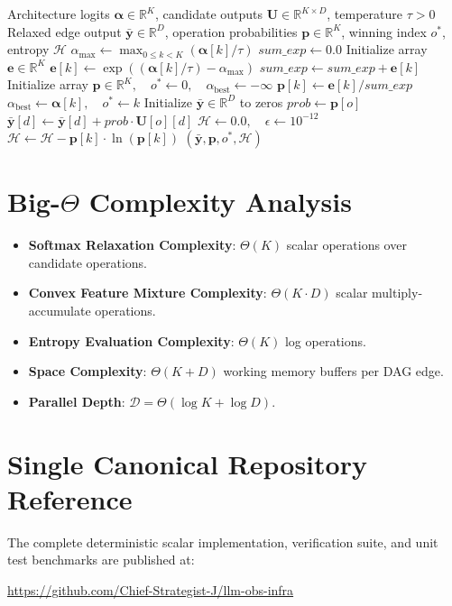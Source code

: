 \documentclass[11pt,a4paper]{article}
\theoremstyle{definition}
\begin{document}
\begin{algorithm}[H]
\caption{Differentiable Architecture Search Edge Relaxation and Discretization}
\begin{algorithmic}[1]
\Require Architecture logits $\boldsymbol{\alpha} \in \mathbb{R}^K$, candidate outputs $\mathbf{U} \in \mathbb{R}^{K \times D}$, temperature $\tau > 0$
\Ensure Relaxed edge output $\bar{\mathbf{y}} \in \mathbb{R}^D$, operation probabilities $\mathbf{p} \in \mathbb{R}^K$, winning index $o^*$, entropy $\mathcal{H}$
\State $\alpha_{\max} \gets \max_{0 \le k < K} (\boldsymbol{\alpha}[k] / \tau)$
\State $sum\_exp \gets 0.0$
\State Initialize array $\mathbf{e} \in \mathbb{R}^K$
    \State $\mathbf{e}[k] \gets \exp\left( (\boldsymbol{\alpha}[k] / \tau) - \alpha_{\max} \right)$
    \State $sum\_exp \gets sum\_exp + \mathbf{e}[k]$
\EndFor
\State Initialize array $\mathbf{p} \in \mathbb{R}^K, \quad o^* \gets 0, \quad \alpha_{\text{best}} \gets -\infty$
    \State $\mathbf{p}[k] \gets \mathbf{e}[k] / sum\_exp$
        \State $\alpha_{\text{best}} \gets \boldsymbol{\alpha}[k], \quad o^* \gets k$
    \EndIf
\EndFor
\State Initialize $\bar{\mathbf{y}} \in \mathbb{R}^D$ to zeros
 
    \State $prob \gets \mathbf{p}[o]$
        \State $\bar{\mathbf{y}}[d] \gets \bar{\mathbf{y}}[d] + prob \cdot \mathbf{U}[o][d]$
    \EndFor
\EndFor
\State $\mathcal{H} \gets 0.0, \quad \epsilon \gets 10^{-12}$
 
        \State $\mathcal{H} \gets \mathcal{H} - \mathbf{p}[k] \cdot \ln(\mathbf{p}[k])$
    \EndIf
\EndFor
\State \Return $(\bar{\mathbf{y}}, \mathbf{p}, o^*, \mathcal{H})$
\end{algorithmic}
\end{algorithm}

\section{Big-$\Theta$ Complexity Analysis}

\begin{itemize}
    \item \textbf{Softmax Relaxation Complexity}: $\Theta(K)$ scalar operations over candidate operations.
    \item \textbf{Convex Feature Mixture Complexity}: $\Theta(K \cdot D)$ scalar multiply-accumulate operations.
    \item \textbf{Entropy Evaluation Complexity}: $\Theta(K)$ log operations.
    \item \textbf{Space Complexity}: $\Theta(K + D)$ working memory buffers per DAG edge.
    \item \textbf{Parallel Depth}: $\mathcal{D} = \Theta(\log K + \log D)$.
\end{itemize}

\section{Single Canonical Repository Reference}

The complete deterministic scalar implementation, verification suite, and unit test benchmarks are published at:
\begin{center}
\url{https://github.com/Chief-Strategist-J/llm-obs-infra}
\end{center}
\end{document}
